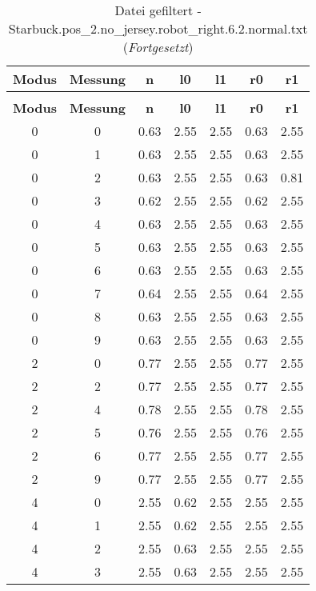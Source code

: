 \begin{longtable}{|c|c||c||c|c||c|c|}
	\caption{Datei gefiltert - Starbuck.pos\_2.no\_jersey.robot\_right.6.2.normal.txt} \label{tab:Starbuck.pos-2.no-jersey.robot-right.6.2.normal.txt} \\ \hline
	\textbf{Modus} & \textbf{Messung} & \textbf{n} & \textbf{l0} & \textbf{l1} & \textbf{r0} & \textbf{r1}\\ \hline
	\endfirsthead
	\caption[]{Datei gefiltert - Starbuck.pos\_2.no\_jersey.robot\_right.6.2.normal.txt (\emph{Fortgesetzt})} \\ \hline
	\textbf{Modus} & \textbf{Messung} & \textbf{n} & \textbf{l0} & \textbf{l1} & \textbf{r0} & \textbf{r1}\\ \hline
	\endhead
	0 & 0 & 0.63 & 2.55 & 2.55 & 0.63 & 2.55 \\ \hline
	0 & 1 & 0.63 & 2.55 & 2.55 & 0.63 & 2.55 \\ \hline
	0 & 2 & 0.63 & 2.55 & 2.55 & 0.63 & 0.81 \\ \hline
	0 & 3 & 0.62 & 2.55 & 2.55 & 0.62 & 2.55 \\ \hline
	0 & 4 & 0.63 & 2.55 & 2.55 & 0.63 & 2.55 \\ \hline
	0 & 5 & 0.63 & 2.55 & 2.55 & 0.63 & 2.55 \\ \hline
	0 & 6 & 0.63 & 2.55 & 2.55 & 0.63 & 2.55 \\ \hline
	0 & 7 & 0.64 & 2.55 & 2.55 & 0.64 & 2.55 \\ \hline
	0 & 8 & 0.63 & 2.55 & 2.55 & 0.63 & 2.55 \\ \hline
	0 & 9 & 0.63 & 2.55 & 2.55 & 0.63 & 2.55 \\ \hline
	2 & 0 & 0.77 & 2.55 & 2.55 & 0.77 & 2.55 \\ \hline
	2 & 2 & 0.77 & 2.55 & 2.55 & 0.77 & 2.55 \\ \hline
	2 & 4 & 0.78 & 2.55 & 2.55 & 0.78 & 2.55 \\ \hline
	2 & 5 & 0.76 & 2.55 & 2.55 & 0.76 & 2.55 \\ \hline
	2 & 6 & 0.77 & 2.55 & 2.55 & 0.77 & 2.55 \\ \hline
	2 & 9 & 0.77 & 2.55 & 2.55 & 0.77 & 2.55 \\ \hline
	4 & 0 & 2.55 & 0.62 & 2.55 & 2.55 & 2.55 \\ \hline
	4 & 1 & 2.55 & 0.62 & 2.55 & 2.55 & 2.55 \\ \hline
	4 & 2 & 2.55 & 0.63 & 2.55 & 2.55 & 2.55 \\ \hline
	4 & 3 & 2.55 & 0.63 & 2.55 & 2.55 & 2.55 \\ \hline

\end{longtable}
